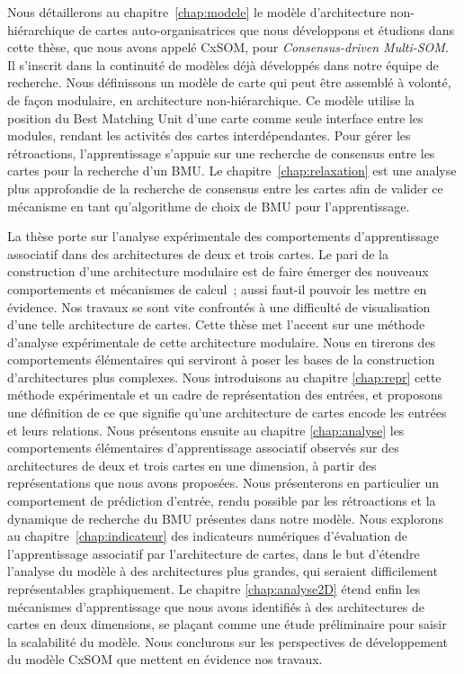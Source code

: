 Nous détaillerons au chapitre~\ref{chap:modele} le modèle d'architecture non-hiérarchique de cartes auto-organisatrices que nous développons et étudions dans cette thèse, que nous avons appelé CxSOM, pour \emph{Consensus-driven Multi-SOM}. Il s'inscrit dans la continuité de modèles déjà développés dans notre équipe de recherche.
Nous définissons un modèle de carte qui peut être assemblé à volonté, de façon modulaire, en architecture non-hiérarchique. Ce modèle utilise la position du Best Matching Unit d'une carte comme seule interface entre les modules, rendant les activités des cartes interdépendantes. Pour gérer les rétroactions, l'apprentissage s'appuie sur une recherche de consensus entre les cartes pour la recherche d'un BMU.
Le chapitre~\ref{chap:relaxation} est une analyse plus approfondie de la recherche de consensus entre les cartes afin de valider ce mécanisme en tant qu'algorithme de choix de BMU pour l'apprentissage.

La thèse porte sur l'analyse expérimentale des comportements d'apprentissage associatif dans des architectures de deux et trois cartes. Le pari de la construction d'une architecture modulaire est de faire émerger des nouveaux comportements et mécanismes de calcul~; aussi faut-il pouvoir les mettre en évidence. Nos travaux se sont vite confrontés à une difficulté de visualisation d'une telle architecture de cartes. Cette thèse met l'accent sur une méthode d'analyse expérimentale de cette architecture modulaire. Nous en tirerons des comportements élémentaires qui serviront à poser les bases de la construction d'architectures plus complexes.
Nous introduisons au chapitre \ref{chap:repr} cette méthode expérimentale et un cadre de représentation des entrées, et proposons une définition de ce que signifie qu'une architecture de cartes encode les entrées et leurs relations.
Nous présentons ensuite au chapitre \ref{chap:analyse} les comportements élémentaires d'apprentissage associatif observés sur des architectures de deux et trois cartes en une dimension, à partir des représentations que nous avons proposées. Nous présenterons en particulier un comportement de prédiction d'entrée, rendu possible par les rétroactions et la dynamique de recherche du BMU présentes dans notre modèle.
Nous explorons au chapitre~\ref{chap:indicateur} des indicateurs numériques d'évaluation de l'apprentissage associatif par l'architecture de cartes, dans le but d'étendre l'analyse du modèle à des architectures plus grandes, qui seraient difficilement représentables graphiquement.
Le chapitre \ref{chap:analyse2D} étend enfin les mécanismes d'apprentissage que nous avons identifiés à des architectures de cartes en deux dimensions, se plaçant comme une étude préliminaire pour saisir la scalabilité du modèle.
Nous conclurons sur les perspectives de développement du modèle CxSOM que mettent en évidence nos travaux.

